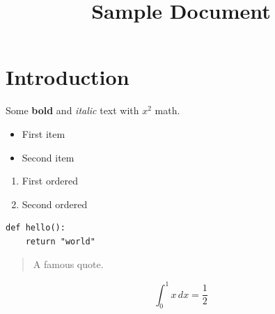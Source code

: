 \documentclass{article}
\title{Sample Document}
\begin{document}
\maketitle

\section{Introduction}

Some \textbf{bold} and \textit{italic} text with $x^2$ math.

\begin{itemize}
\item First item
\item Second item
\end{itemize}

\begin{enumerate}
\item First ordered
\item Second ordered
\end{enumerate}

\begin{verbatim}
def hello():
    return "world"
\end{verbatim}

\begin{quote}
A famous quote.
\end{quote}

\[
\int_0^1 x \, dx = \frac{1}{2}
\]
\end{document}
